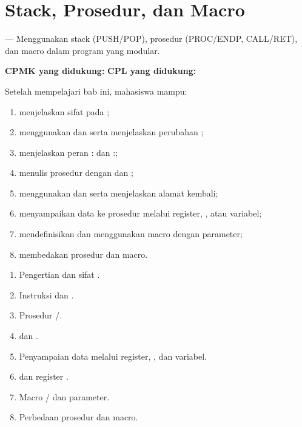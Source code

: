 \documentclass[../../main.tex]{subfiles}
\begin{document}
\chapter{Stack, Prosedur, dan Macro}
\label{chap:prosedur}


\begin{subcpmkbox}
\vspace{1.1em}
 --- Menggunakan stack (PUSH/POP), prosedur (PROC/ENDP,
CALL/RET), dan macro dalam program yang modular.

\vspace{0.4em}
\textbf{CPMK yang didukung:}  \quad\textbullet\quad
\textbf{CPL yang didukung:} 
\end{subcpmkbox}

\begin{tujuanbox}
\vspace{1.1em}
Setelah mempelajari bab ini, mahasiswa mampu:
\begin{enumerate}
    \item menjelaskan sifat  pada
          ;
    \item menggunakan  dan  serta menjelaskan
          perubahan ;
    \item menjelaskan peran : dan :;
    \item menulis prosedur dengan  dan ;
    \item menggunakan  dan  serta menjelaskan
          alamat kembali;
    \item menyampaikan data ke prosedur melalui register,
          , atau variabel;
    \item mendefinisikan dan menggunakan macro dengan parameter;
    \item membedakan prosedur dan macro.
\end{enumerate}
\end{tujuanbox}

\begin{materibox}
\vspace{1.1em}
\begin{enumerate}
    \item Pengertian dan sifat .
    \item Instruksi  dan .
    \item Prosedur /.
    \item {} dan .
    \item Penyampaian data melalui register, , dan
          variabel.
    \item {} dan register .
    \item Macro / dan parameter.
    \item Perbedaan prosedur dan macro.
\end{enumerate}
\end{materibox}










\end{document}
